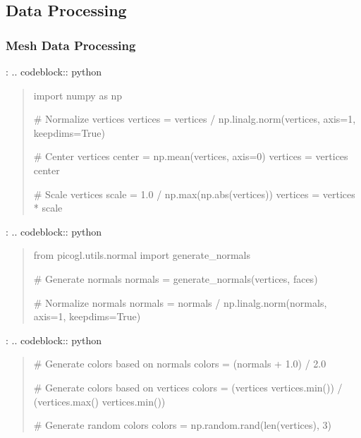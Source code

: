 \documentclass[a4paper,10pt,english,openany,oneside]{sphinxmanual}
\begin{document}
\subsection{Data Processing}
\label{\detokenize{api/utils:data-processing}}

\subsubsection{Mesh Data Processing}
\label{\detokenize{api/utils:mesh-data-processing}}
\sphinxAtStartPar
{}:
.. code\sphinxhyphen{}block:: python
\begin{quote}

\sphinxAtStartPar
import numpy as np

\sphinxAtStartPar
\# Normalize vertices
vertices = vertices / np.linalg.norm(vertices, axis=1, keepdims=True)

\sphinxAtStartPar
\# Center vertices
center = np.mean(vertices, axis=0)
vertices = vertices \sphinxhyphen{} center

\sphinxAtStartPar
\# Scale vertices
scale = 1.0 / np.max(np.abs(vertices))
vertices = vertices * scale
\end{quote}

\sphinxAtStartPar
{}:
.. code\sphinxhyphen{}block:: python
\begin{quote}

\sphinxAtStartPar
from picogl.utils.normal import generate\_normals

\sphinxAtStartPar
\# Generate normals
normals = generate\_normals(vertices, faces)

\sphinxAtStartPar
\# Normalize normals
normals = normals / np.linalg.norm(normals, axis=1, keepdims=True)
\end{quote}

\sphinxAtStartPar
{}:
.. code\sphinxhyphen{}block:: python
\begin{quote}

\sphinxAtStartPar
\# Generate colors based on normals
colors = (normals + 1.0) / 2.0

\sphinxAtStartPar
\# Generate colors based on vertices
colors = (vertices \sphinxhyphen{} vertices.min()) / (vertices.max() \sphinxhyphen{} vertices.min())

\sphinxAtStartPar
\# Generate random colors
colors = np.random.rand(len(vertices), 3)
\end{quote}
\end{document}
